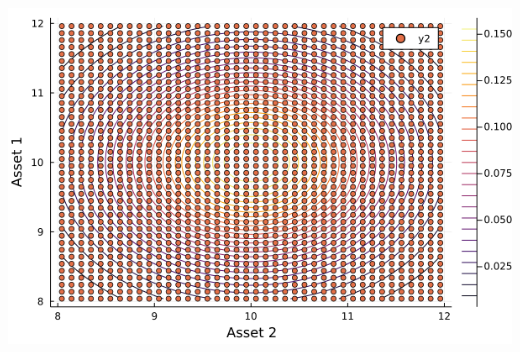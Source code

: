 \documentclass[
  ignorenonframetext,
]{beamer}
\begin{document}
\begin{frame}{}
\protect\hypertarget{section-1}{}
\begin{center}\includegraphics[width=0.95\paperheight]{complexity_files/figure-beamer/unnamed-chunk-22-1} \end{center}
\end{frame}
\end{document}
